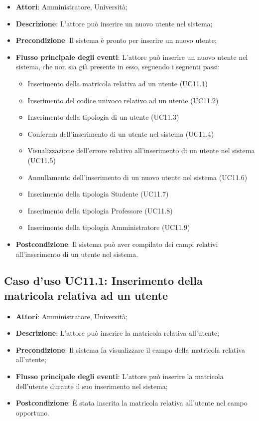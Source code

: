\begin{itemize}
\item \textbf{Attori}: Amministratore, Università;
\item \textbf{Descrizione}: L'attore può inserire un nuovo utente nel sistema;
\item \textbf{Precondizione}: Il sistema è pronto per inserire un nuovo utente;
\item \textbf{Flusso principale degli eventi}: L'attore può inserire un nuovo utente nel sistema, che non sia già presente in esso, seguendo i seguenti passi:
\begin{itemize}
\item Inserimento della matricola relativa ad un utente (UC11.1)
\item Inserimento del codice univoco relativo ad un utente (UC11.2)
\item Inserimento della tipologia di un utente  (UC11.3)
\item Conferma dell'inserimento di un utente nel sistema (UC11.4)
\item Visualizzazione dell'errore relativo all'inserimento di un utente nel sistema (UC11.5)
\item Annullamento dell'inserimento di un nuovo utente nel sistema (UC11.6)
\item Inserimento della tipologia Studente (UC11.7)
\item Inserimento della tipologia Professore (UC11.8)
\item Inserimento della tipologia Amministratore (UC11.9)
\end{itemize}
\item \textbf{Postcondizione}: Il sistema può aver compilato dei campi relativi all'inserimento di un utente nel sistema.

\end{itemize}
\subsection{Caso d'uso \texorpdfstring{UC11.1}{UC11.1}: Inserimento della matricola relativa ad un utente}
\begin{itemize}
\item \textbf{Attori}: Amministratore, Università;
\item \textbf{Descrizione}: L'attore può inserire la matricola relativa all'utente;
\item \textbf{Precondizione}: Il sistema fa visualizzare il campo della matricola relativa all'utente;
\item \textbf{Flusso principale degli eventi}: L'attore può inserire la matricola dell'utente durante il suo inserimento nel sistema;
\item \textbf{Postcondizione}: È stata inserita la matricola relativa all'utente nel campo opportuno.
\end{itemize}
